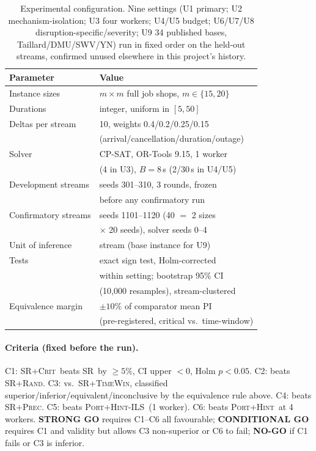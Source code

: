 \documentclass[letterpaper]{article} %
\newcommand{\base}{\textsc{SR}}
\newcommand{\crit}{\textsc{SR+Crit}}
\newcommand{\rnd}{\textsc{SR+Rand}}
\newcommand{\tw}{\textsc{SR+TimeWin}}
\newcommand{\precn}{\textsc{SR+Prec}}
\newcommand{\ph}{\textsc{Port+Hint}}
\newcommand{\native}{\textsc{Port+Hint-ILS}}
\begin{document}
\begin{table}[t]
\centering\small
\setlength{\tabcolsep}{3pt}
\begin{tabular}{ll}
\toprule
Parameter & Value \\
\midrule
Instance sizes & $m \times m$ full job shops, $m \in \{15,20\}$ \\
Durations & integer, uniform in $[5,50]$ \\
Deltas per stream & 10, weights 0.4/0.2/0.25/0.15 \\
 & (arrival/cancellation/duration/outage) \\
Solver & CP-SAT, OR-Tools 9.15, 1 worker \\
 & (4 in U3), $B=8$\,s (2/30\,s in U4/U5) \\
Development streams & seeds 301--310, 3 rounds, frozen \\
 & before any confirmatory run \\
Confirmatory streams & seeds 1101--1120 (40 $=$ 2 sizes \\
 & $\times$ 20 seeds), solver seeds 0--4 \\
Unit of inference & stream (base instance for U9) \\
Tests & exact sign test, Holm-corrected \\
 & within setting; bootstrap 95\% CI \\
 & (10{,}000 resamples), stream-clustered \\
Equivalence margin & $\pm10\%$ of comparator mean PI \\
 & (pre-registered, critical vs.\ time-window) \\
\bottomrule
\end{tabular}
\caption{Experimental configuration. Nine settings (U1 primary; U2 mechanism-isolation; U3 four workers; U4/U5 budget; U6/U7/U8 disruption-specific/severity; U9 34 published bases, Taillard/DMU/SWV/YN) run in fixed order on the held-out streams, confirmed unused elsewhere in this project's history.}
\label{tab:exp}
\end{table}

\paragraph{Criteria (fixed before the run).} C1: \crit\ beats \base\ by $\ge5\%$, CI upper $<0$, Holm $p<0.05$. C2: beats \rnd. C3: vs.\ \tw, classified superior/inferior/equivalent/inconclusive by the equivalence rule above. C4: beats \precn. C5: beats \native\ (1 worker). C6: beats \ph\ at 4 workers. \textbf{STRONG GO} requires C1--C6 all favourable; \textbf{CONDITIONAL GO} requires C1 and validity but allows C3 non-superior or C6 to fail; \textbf{NO-GO} if C1 fails or C3 is inferior.
\end{document}
